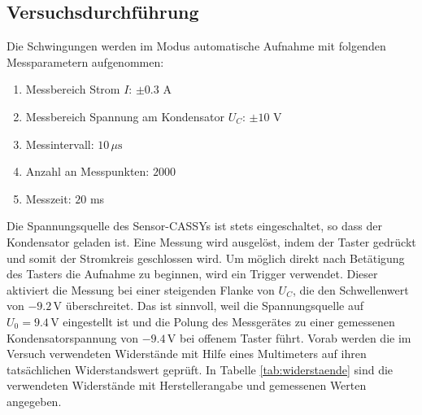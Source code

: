\documentclass[a4paper, 12pt]{scrartcl}
\begin{document}
\subsection{Versuchsdurchführung}

Die Schwingungen werden im Modus \glqq automatische Aufnahme\grqq{} mit folgenden Messparametern aufgenommen:
\begin{enumerate}[-]
\setlength{\itemsep}{-5pt}
\item Messbereich Strom $I$: $\pm 0.3$ A
\item Messbereich Spannung am Kondensator $U_C$: $\pm 10$ V
\item Messintervall: $10 \, \mu\text{s}$
\item Anzahl an Messpunkten: $2000$
\item Messzeit: $20$ ms
\end{enumerate}
Die Spannungsquelle des Sensor-CASSYs ist stets eingeschaltet, so dass der Kondensator geladen ist. Eine Messung wird ausgelöst, indem der Taster gedrückt und somit der Stromkreis geschlossen wird. Um möglich direkt nach Betätigung des Tasters die Aufnahme zu beginnen, wird ein Trigger verwendet. Dieser aktiviert die Messung bei einer steigenden Flanke von $U_C$, die den Schwellenwert von $-9.2 \, \mathrm V$ überschreitet. Das ist sinnvoll, weil die Spannungsquelle auf $U_0 = 9.4 \, \mathrm V$ eingestellt ist und die Polung des Messgerätes zu einer gemessenen Kondensatorspannung von $-9.4 \, \mathrm V$ bei offenem Taster führt. 
Vorab werden die im Versuch verwendeten Widerstände mit Hilfe eines Multimeters auf ihren tatsächlichen Widerstandswert geprüft. In Tabelle \ref{tab:widerstaende} sind die verwendeten Widerstände mit Herstellerangabe und gemessenen Werten angegeben.
\end{document}
